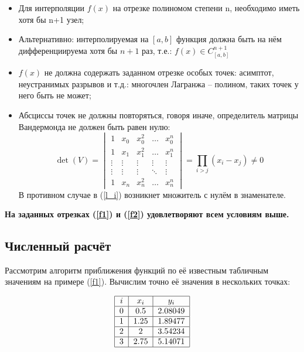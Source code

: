 \documentclass[a4paper, 14pt]{article}
\begin{document}
\begin{itemize}
    \item Для интерполяции $f(x)$ на отрезке полиномом степени n, необходимо иметь хотя бы n+1 узел;
    \item Альтернативно: интерполируемая на $[a,b]$ функция должна быть на нём дифференциируема хотя бы $n+1$ раз, т.е.: $f(x)\in C^{n+1}_{[a,b]}$
    \item $f(x)$ не должна содержать заданном отрезке особых точек: асимптот, неустранимых разрывов и т.д.: многочлен Лагранжа -- полином, таких точек у него быть не может;
    \item Абсциссы точек не должны повторяться, говоря иначе, определитель матрицы Вандермонда не должен быть равен нулю:
    \begin{equation}
        \det(V) =
        \begin{vmatrix}
            1 & x_0 & x_0^2 & \hdots & x_0^n \\
            1 & x_1 & x_1^2 & \hdots & x_1^n \\
            \vdots & \vdots & \vdots & \vdots & \vdots \\
            \vdots & \vdots & \vdots & \ddots & \vdots \\
            1 & x_n & x_n^2 & \hdots & x_n^n
        \end{vmatrix} =
        \prod_{i>j}{(x_i-x_j)} \ne 0
    \end{equation}
    В противном случае в (\ref{l_i}) возникнет множитель с нулём в знаменателе.
\end{itemize}

{\bf На заданных отрезках (\ref{f1}) и (\ref{f2}) удовлетворяют всем условиям выше.}

\subsection{Численный расчёт}

Рассмотрим алгоритм приближения функций по её известным табличным значениям на примере (\ref{f1}). Вычислим точно её значения в нескольких точках:

\begin{align}
    \label{4nodes_f1}
    \begin{tabular}{|c|c|c|}
        \hline
        $i$ & $x_i$ & $y_i$ \\
        \hline
        0 & 0.5 & 2.08049 \\
        \hline
        1 & 1.25 & 1.89477 \\
        \hline
        2 & 2 & 3.54234 \\
        \hline
        3 & 2.75 & 5.14071 \\
        \hline
    \end{tabular}
\end{align}
\end{document}
